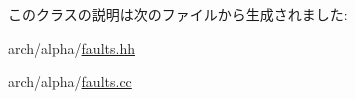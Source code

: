 このクラスの説明は次のファイルから生成されました:\begin{DoxyCompactItemize}
\item 
arch/alpha/\hyperlink{arch_2alpha_2faults_8hh}{faults.hh}\item 
arch/alpha/\hyperlink{arch_2alpha_2faults_8cc}{faults.cc}\end{DoxyCompactItemize}
